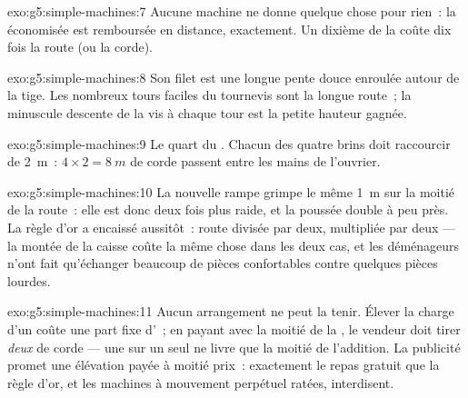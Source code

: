 \begin{solution}{exo:g5:simple-machines:7}
Aucune machine ne donne quelque chose pour rien~: la  économisée
est remboursée en distance, exactement. Un dixième de la  coûte
dix fois la route (ou la corde).
\end{solution}

\begin{solution}{exo:g5:simple-machines:8}
Son filet est une longue pente douce enroulée autour de la tige. Les
nombreux tours faciles du tournevis sont la longue route~; la
minuscule descente de la vis à chaque tour est la petite hauteur
gagnée.
\end{solution}

\begin{solution}{exo:g5:simple-machines:9}
Le quart du . Chacun des quatre brins doit raccourcir de
\qty{2}{m}~: $4 \times 2 = \qty{8}{m}$ de corde passent entre les
mains de l'ouvrier.
\end{solution}

\begin{solution}{exo:g5:simple-machines:10}
La nouvelle rampe grimpe le même \qty{1}{m} sur la moitié de la
route~: elle est donc deux fois plus raide, et la poussée double à
peu près. La règle d'or a encaissé aussitôt~: route divisée par deux,
 multipliée par deux --- la montée de la caisse coûte la même
chose dans les deux cas, et les déménageurs n'ont fait qu'échanger
beaucoup de pièces confortables contre quelques pièces lourdes.
\end{solution}

\begin{solution}{exo:g5:simple-machines:11}
Aucun arrangement ne peut la tenir. Élever la charge d'un  coûte
une part fixe d'~; en payant avec la moitié de la , le
vendeur doit tirer \emph{deux}  de corde --- une  sur
un seul  ne livre que la moitié de l'addition. La publicité
promet une élévation payée à moitié prix~: exactement le repas gratuit
que la règle d'or, et les machines à mouvement perpétuel ratées,
interdisent.
\end{solution}
